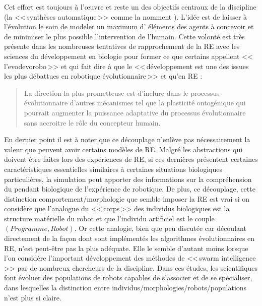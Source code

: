 Cet effort est toujours à l'œuvre et reste un des objectifs centraux de la discipline (la <<\,synthèses automatique\,>> comme la nomment \cite{doncieux2009exploringnewhorizonsinevolutionqryrobotics}). L'idée est de laisser à l'évolution le soin de modeler un maximum d' éléments des agents à concevoir et de minimiser le plus possible l'intervention de l'humain. Cette volonté est très présente dans les nombreuses tentatives de rapprochement de la RE avec les sciences du développement en biologie pour former ce que certains appellent <<\,l'evodevorobo\,>> \citep{bredeche11evolutionaryadaptationpopulationrobots} et qui fait dire à \citet[p. 17]{nolfi00evolrobobiolintetechselfmach} que le <<\,développement est une des issues les plus débattues en robotique évolutionnaire\,>> et qu'en RE :

\begin{quotation}

   La direction la plus prometteuse est d'inclure dans le processus évolutionnaire d'autres mécanismes tel que la plasticité ontogénique qui pourrait augmenter la puissance adaptative du processus évolutionnaire sans accroitre le rôle du concepteur humain.

\end{quotation}

En dernier point il est à noter que ce découplage n'enlève pas nécessairement la valeur que peuvent avoir certains modèles de RE. Malgré les abstractions  qui doivent être faites lors des expériences de RE, si ces dernières présentent certaines caractéristiques essentielles similaires à certaines situations biologiques particulières, la simulation peut apporter des informations sur la compréhension du pendant biologique de l'expérience de robotique. De plus, ce découplage, cette distinction comportement/morphologie que semble imposer la RE est vrai si on considère que l'analogue du <<\,corps\,>> des individus biologiques est la structure matérielle du robot et que l'individu artificiel est le couple $(Programme,Robot)$. Or cette analogie, bien que peu discutée car découlant directement de la façon dont sont implémentés les algorithmes évolutionnaires en RE, n'est peut-être pas la plus adéquate. Elle le semble d'autant moins lorsque l'on considère l'important développement des méthodes de <<\,swarm intelligence\,>> par de nombreux chercheurs de la discipline. Dans ces études, les scientifiques font évoluer des populations de robots capables de s'associer et de se spécialiser, dans lesquelles la distinction entre individus/morphologies/robots/populations n'est plus si claire.

